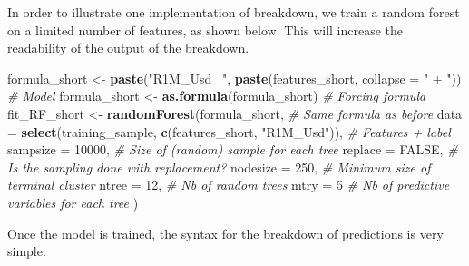\documentclass[]{krantz}
\makeatletter
\newenvironment{Shaded}{\begin{snugshade}}{\end{snugshade}}
\newcommand{\CommentTok}[1]{\textcolor[rgb]{0.37,0.37,0.37}{\textit{#1}}}
\newcommand{\DataTypeTok}[1]{\textcolor[rgb]{0.27,0.27,0.27}{#1}}
\newcommand{\DecValTok}[1]{\textcolor[rgb]{0.06,0.06,0.06}{#1}}
\newcommand{\KeywordTok}[1]{\textcolor[rgb]{0.27,0.27,0.27}{\textbf{#1}}}
\newcommand{\NormalTok}[1]{#1}
\newcommand{\OperatorTok}[1]{\textcolor[rgb]{0.43,0.43,0.43}{\textbf{#1}}}
\newcommand{\OtherTok}[1]{\textcolor[rgb]{0.37,0.37,0.37}{#1}}
\newcommand{\StringTok}[1]{\textcolor[rgb]{0.5,0.5,0.5}{#1}}
\newenvironment{kframe}{%
\medskip{}
\setlength{\fboxsep}{.8em}
 \def\at@end@of@kframe{}%
 \ifinner\ifhmode%
  \def\at@end@of@kframe{\end{minipage}}%
  \begin{minipage}{\columnwidth}%
 \fi\fi%
 \def\FrameCommand##1{\hskip\@totalleftmargin \hskip-\fboxsep
 \colorbox{shadecolor}{##1}\hskip-\fboxsep
     \hskip-\linewidth \hskip-\@totalleftmargin \hskip\columnwidth}%
 \MakeFramed {\advance\hsize-\width
   \@totalleftmargin\z@ \linewidth\hsize
   \@setminipage}}%
 {\par\unskip\endMakeFramed%
 \at@end@of@kframe}
\renewenvironment{Shaded}{\begin{kframe}}{\end{kframe}}
\theoremstyle{definition}
\theoremstyle{definition}
\theoremstyle{definition}
\theoremstyle{remark}
\makeatother
\begin{document}
In order to illustrate one implementation of breakdown, we train a
random forest on a limited number of features, as shown below. This will
increase the readability of the output of the breakdown.

\footnotesize

\begin{Shaded}
\begin{Highlighting}[]
\NormalTok{formula_short <-}\StringTok{ }\KeywordTok{paste}\NormalTok{(}\StringTok{"R1M_Usd ~"}\NormalTok{, }\KeywordTok{paste}\NormalTok{(features_short, }\DataTypeTok{collapse =} \StringTok{" + "}\NormalTok{)) }\CommentTok{#  Model }
\NormalTok{formula_short <-}\StringTok{ }\KeywordTok{as.formula}\NormalTok{(formula_short)                                   }\CommentTok{# Forcing formula}
\NormalTok{fit_RF_short <-}\StringTok{ }\KeywordTok{randomForest}\NormalTok{(formula_short, }\CommentTok{# Same formula as before}
                 \DataTypeTok{data =} \KeywordTok{select}\NormalTok{(training_sample, }\KeywordTok{c}\NormalTok{(features_short, }\StringTok{"R1M_Usd"}\NormalTok{)), }\CommentTok{# Features + label }
                 \DataTypeTok{sampsize =} \DecValTok{10000}\NormalTok{,          }\CommentTok{# Size of (random) sample for each tree}
                 \DataTypeTok{replace =} \OtherTok{FALSE}\NormalTok{,           }\CommentTok{# Is the sampling done with replacement?}
                 \DataTypeTok{nodesize =} \DecValTok{250}\NormalTok{,            }\CommentTok{# Minimum size of terminal cluster}
                 \DataTypeTok{ntree =} \DecValTok{12}\NormalTok{,                }\CommentTok{# Nb of random trees}
                 \DataTypeTok{mtry =} \DecValTok{5}                   \CommentTok{# Nb of predictive variables for each tree}
\NormalTok{    )}
\end{Highlighting}
\end{Shaded}

\normalsize

Once the model is trained, the syntax for the breakdown of predictions
is very simple.

\footnotesize

\begin{Shaded}
\end{Shaded}
\end{document}
